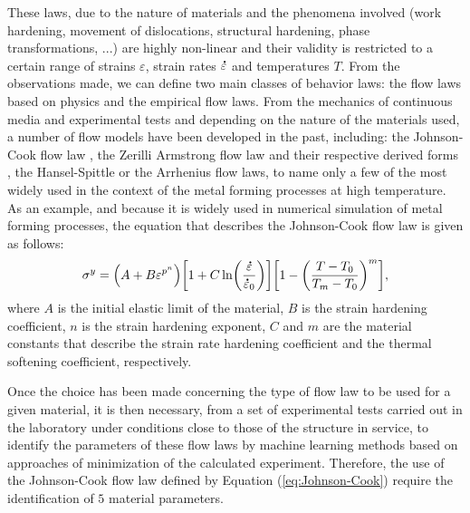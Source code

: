 \documentclass[algorithms,article,submit,pdftex,moreauthors]{Definitions/mdpi}
\DeclareRobustCommand{\mdot}[1]{\accentset{\mbox{\bfseries .}}{#1}}
\begin{document}
These laws, due to the nature of materials and the phenomena involved (work hardening, movement of dislocations, structural hardening, phase transformations, ...) are highly non-linear and their validity is restricted to a certain range of strains $\varepsilon$, strain rates $\mdot\varepsilon$ and temperatures $T$.
From the observations made, we can define two main classes of behavior laws: the flow laws based on physics and the empirical flow laws.
From the mechanics of continuous media and experimental tests and depending on the nature of the materials used, a number of flow models have been developed in the past, including: the Johnson-Cook flow law \cite{Johnson-1983}, the Zerilli Armstrong flow law \cite{Zerilli-1987} and their respective derived forms \cite{Rule-1998, Lin-2011, Li-2013, Zhang-2015, Zhou-2020}, the Hansel-Spittle \cite{Hensel-1978} or the Arrhenius \cite{Jonas-1969} flow laws, to name only a few of the most widely used in the context of the metal forming processes at high temperature.
As an example, and because it is widely used in numerical simulation of metal forming processes, the equation that describes the Johnson-Cook flow law \cite{Johnson-1983} is given as follows:
\begin{equation}
\sigma^y=\left(A+B\varepsilon^{p^{n}}\right) \left[1+C\ln\left(\frac{\mdot\varepsilon}{\mdot\varepsilon_0}\right)\right] \left[1-\left(\frac{T-T_0}{T_m-T_0}\right)^{m}\right],\label{eq:Johnson-Cook}
\end{equation}
where $A$ is the initial elastic limit of the material, $B$ is the strain hardening coefficient, $n$ is the strain hardening exponent, $C$ and $m$ are the material constants that describe the strain rate hardening coefficient and the thermal softening coefficient, respectively.

Once the choice has been made concerning the type of flow law to be used for a given material, it is then necessary, from a set of experimental tests carried out in the laboratory under conditions close to those of the structure in service, to identify the parameters of these flow laws by machine learning methods based on approaches of minimization of the calculated experiment.
Therefore, the use of the Johnson-Cook flow law defined by Equation (\ref{eq:Johnson-Cook}) require the identification of $5$ material parameters.
\end{document}
